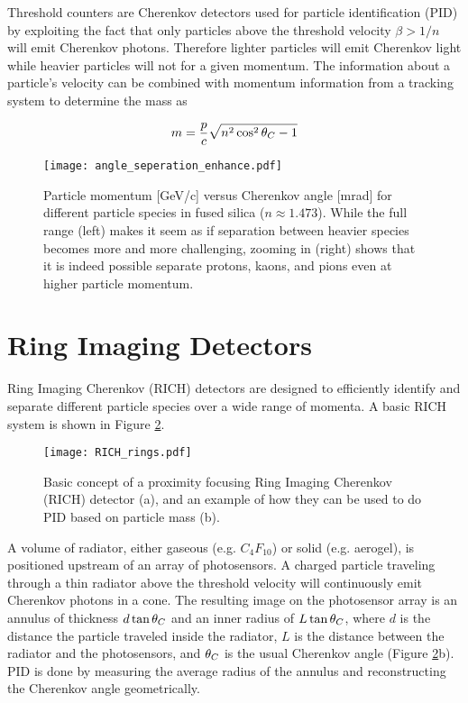 Threshold counters are Cherenkov detectors used for particle identification (PID) by exploiting the fact that only particles above the threshold velocity $\beta > 1/n$ will emit Cherenkov photons. Therefore lighter particles will emit Cherenkov light while heavier particles will not for a given momentum. The information about a particle's velocity can be combined with momentum information from a tracking system to determine the mass as \cite{ParticleDetectionHandbook}

\begin{equation}
	m = \frac{p}{c} \sqrt{n^2 \cos^2\theta_{C} - 1}
	\label{eq:mass}
\end{equation}

\begin{figure}[!htb]
	\centering
	\texttt{[image: angle\_seperation\_enhance.pdf]}
	\caption{Particle momentum [GeV/c] versus Cherenkov angle [mrad] for different particle species in fused silica ($n \approx 1.473$). While the full range (left) makes it seem as if separation between heavier species becomes more and more challenging, zooming in (right) shows that it is indeed possible separate protons, kaons, and pions even at higher particle momentum.}
	\label{fig:angleseperation}
\end{figure}

\section{Ring Imaging Detectors}
Ring Imaging Cherenkov (RICH) detectors are designed to efficiently identify and separate different particle species over a wide range of momenta. A basic RICH system is shown in Figure \ref{fig:rich_basics}. 

\begin{figure}[!htb]
	\centering
	\texttt{[image: RICH\_rings.pdf]}
	\caption{Basic concept of a proximity focusing Ring Imaging Cherenkov (RICH) detector (a), and an example of how they can be used to do PID based on particle mass (b).}
	\label{fig:rich_basics}
\end{figure}

A volume of radiator, either gaseous (e.g. $C_{4}F_{10}$) or solid (e.g. aerogel), is positioned upstream of an array of photosensors. A charged particle traveling through a thin radiator above the threshold velocity will continuously emit Cherenkov photons in a cone. The resulting image on the photosensor array is an annulus of thickness $d\tan\theta_{C}$ and an inner radius of $L\tan\theta_{C}$, where $d$ is the distance the particle traveled inside the radiator, $L$ is the distance between the radiator and the photosensors, and  $\theta_{C}$ is the usual Cherenkov angle (Figure \ref{fig:rich_basics}b). PID is done by measuring the average radius of the annulus and reconstructing the Cherenkov angle geometrically.


